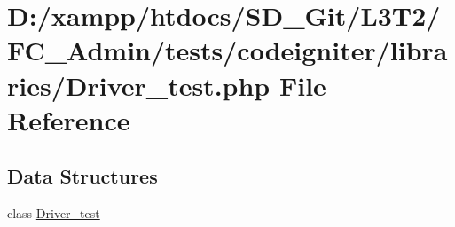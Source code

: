 \hypertarget{_driver__test_8php}{}\section{D\+:/xampp/htdocs/\+S\+D\+\_\+\+Git/\+L3\+T2/\+F\+C\+\_\+\+Admin/tests/codeigniter/libraries/\+Driver\+\_\+test.php File Reference}
\label{_driver__test_8php}
\subsection*{Data Structures}
\begin{DoxyCompactItemize}
\item 
class \hyperlink{class_driver__test}{Driver\+\_\+test}
\end{DoxyCompactItemize}
